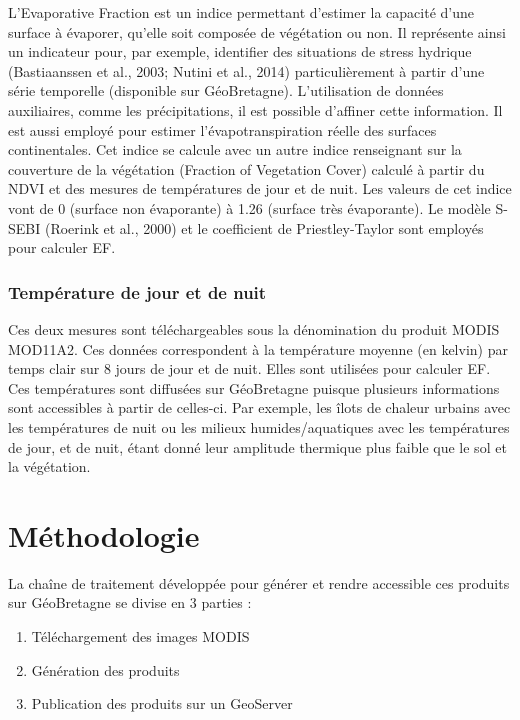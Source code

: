 \documentclass[10pt,a4paper]{article}
\begin{document}
L'Evaporative Fraction est un indice permettant d'estimer la capacité d'une
surface à évaporer, qu’elle soit composée de végétation ou non. Il représente ainsi un indicateur pour, par exemple, identifier des situations de stress hydrique (Bastiaanssen et al., 2003; Nutini et al., 2014) particulièrement à partir d'une série temporelle (disponible sur GéoBretagne). L'utilisation de données auxiliaires, comme les précipitations, il est possible d'affiner cette information.\smallbreak
Il est aussi employé pour estimer l'évapotranspiration réelle des surfaces continentales. Cet indice se calcule avec un autre indice renseignant sur la couverture de la végétation (Fraction of Vegetation Cover) calculé à partir du NDVI et des mesures de températures de jour et de nuit. Les valeurs de cet indice vont de 0 (surface non évaporante) à 1.26 (surface très évaporante). Le modèle S-SEBI (Roerink et al., 2000) et le coefficient de Priestley-Taylor sont employés pour calculer EF.\smallbreak

\subsubsection{Température de jour et de nuit}

Ces deux mesures sont téléchargeables sous la dénomination du produit MODIS MOD11A2. Ces données correspondent à la température moyenne (en kelvin) par temps clair sur 8 jours de jour et de nuit. Elles sont utilisées pour calculer EF. Ces températures sont diffusées sur GéoBretagne puisque plusieurs informations sont accessibles à partir de celles-ci. Par exemple, les îlots de chaleur urbains avec les températures de nuit ou les milieux humides/aquatiques avec les températures de jour, et de nuit, étant donné leur amplitude thermique plus faible que le sol et la végétation.

\section{Méthodologie}

La chaîne de traitement développée pour générer et rendre accessible ces produits sur GéoBretagne se divise en 3 parties :

\begin{enumerate}
\item Téléchargement des images MODIS
\item Génération des produits
\item Publication des produits sur un GeoServer
\end{enumerate}
\end{document}
